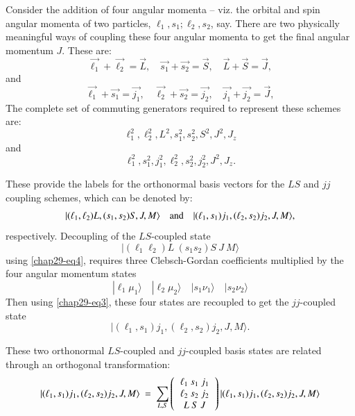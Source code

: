 Consider the addition of four angular momenta -- viz. the orbital and spin angular momenta of two particles, $\ell_1, s_1; \ell_2, s_2$, say. There are two physically meaningful ways of coupling these four angular momenta to get the final angular momentum $J$. These are:
\begin{equation}
\vec{\ell_1}+\vec{\ell_2} = \vec{L},\quad \vec{s_1}+\vec{s_2} = \vec{S},\quad \vec{L}+\vec{S} = \vec{J},\label{chap29-eq44}
\end{equation}
and 
\begin{equation}
\vec{\ell_1}+\vec{s_1} = \vec{j_1},\quad \vec{\ell_2}+\vec{s_2} = \vec{j_2},\quad \vec{j_1}+\vec{j_2} = \vec{J},\label{chap29-eq45}
\end{equation}
The complete set of commuting generators required to represent these schemes are:
\begin{equation}
\ell_1^2, \ell_2^2, L^2, s_1^2, s_2^2, S^2, J^2, J_z \label{chap29-eq46}
\end{equation}
and
\begin{equation}
\ell_1^2, s_1^2, j_1^2, \ell_2^2, s_2^2, j_2^2, J^2, J_z. \label{chap29-eq47}
\end{equation}

These provide the labels for the orthonormal basis vectors for the $LS$ and $jj$ coupling schemes, which can be denoted by:
\begin{equation}
|(\ell_1, \ell_2) L, (s_1, s_2) S, J, M\rangle \quad {\rm and} \quad |(\ell_1, s_1) j_1, (\ell_2, s_2) j_2, J, M\rangle ,\label{chap29-eq48}
\end{equation}
respectively. Decoupling  of the $LS$-coupled state
\begin{equation*}
|(\ell_1 \ell_2) L\ (s_1 s_2) S\ J\ M \rangle \label{chap29-eq48a}
\end{equation*}
using \eqref{chap29-eq4}, requires three Clebsch-Gordan coefficients multiplied by the four angular momentum states
\begin{equation}
|\ell_1 \mu_1 \rangle \quad |\ell_2 \mu_2 \rangle \quad |s_1 \nu_1 \rangle \quad  |s_2 \nu_2 \rangle \label{chap29-eq49}
\end{equation}
Then using \eqref{chap29-eq3}, these four states are recoupled to get the $jj$-coupled state  
\begin{equation*}
|(\ell_1, s_1) j_1, (\ell_2, s_2) j_2, J, M\rangle.\label{chap29-eq48b}
\end{equation*}

These two orthonormal $LS$-coupled and $jj$-coupled basis states are related through an orthogonal transformation:
\begin{equation}
|(\ell_1, s_1) j_1, (\ell_2, s_2) j_2, J, M\rangle \ =\ 
\sum_{L,S} 
\left(
\begin{tabular}{c}
$\ell_1 \ s_1 \ j_1$\\   
$\ell_2 \ s_2 \ j_2$\\ 
$L \ S \ J$\\ 
\end{tabular}
\right)
|(\ell_1, s_1) j_1, (\ell_2, s_2) j_2, J, M\rangle  \label{chap29-eq50}
\end{equation}

